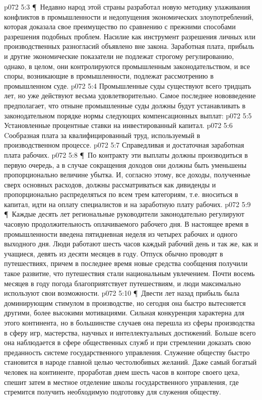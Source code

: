 \vs p072 5:3 \P\ Недавно народ этой страны разработал новую методику улаживания конфликтов в промышленности и недопущения экономических злоупотреблений, которая доказала свое преимущество по сравнению с прежними способами разрешения подобных проблем. Насилие как инструмент разрешения личных или производственных разногласий объявлено вне закона. Заработная плата, прибыль и другие экономические показатели не подлежат строгому регулированию, однако, в целом, они контролируются промышленным законодательством, и все споры, возникающие в промышленности, подлежат рассмотрению в промышленном суде.
\vs p072 5:4 Промышленные суды существуют всего тридцать лет, но уже действуют весьма удовлетворительно. Самое последнее нововведение предполагает, что отныне промышленные суды должны будут устанавливать в законодательном порядке нормы следующих компенсационных выплат:
\vs p072 5:5 \bibnobreakspace Установленные процентные ставки на инвестированный капитал.
\vs p072 5:6 \bibnobreakspace Cообразная плата за квалифицированный труд, используемый в производственном процессе.
\vs p072 5:7 \bibnobreakspace Справедливая и достаточная заработная плата рабочих.
\vs p072 5:8 \P\ По контракту эти выплаты должны производиться в первую очередь, а в случае сокращения доходов они должны быть уменьшены пропорционально величине убытка. И, согласно этому, все доходы, полученные сверх основных расходов, должны рассматриваться как дивиденды и пропорционально распределяться по всем трем категориям, т.е. вноситься в капитал, идти на оплату специалистов и на заработную плату рабочих.
\vs p072 5:9 \P\ Каждые десять лет региональные руководители законодательно регулируют часовую продолжительность оплачиваемого рабочего дня. В настоящее время в промышленности введена пятидневная неделя из четырех рабочих и одного выходного дня. Люди работают шесть часов каждый рабочий день и так же, как и учащиеся, девять из десяти месяцев в году. Отпуск обычно проводят в путешествиях, причем в последнее время новые средства сообщения получили такое развитие, что путешествия стали национальным увлечением. Почти восемь месяцев в году погода благоприятствует путешествиям, и люди максимально используют свои возможности.
\vs p072 5:10 \P\ Двести лет назад прибыль была доминирующим стимулом в производстве, но сегодня она быстро вытесняется другими, более высокими мотивациями. Сильная конкуренция характерна для этого континента, но в большинстве случаев она перешла из сферы производства в сферу игр, мастерства, научных и интеллектуальных достижений. Больше всего она наблюдается в сфере общественных служб и при стремлении доказать свою преданность системе государственного управления. Служение обществу быстро становится в народе главной целью честолюбивых желаний. Даже самый богатый человек на континенте, проработав днем шесть часов в конторе своего цеха, спешит затем в местное отделение школы государственного управления, где стремится получить необходимую подготовку для служения обществу.
